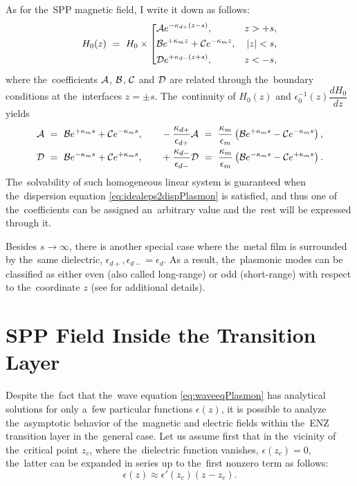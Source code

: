 As for the~SPP magnetic field, I write it down as follows:
\begin{equation}
\label{eq:idealeps2HfieldPlasmon}
H_0(z)~=~H_0 \times \left[
\begin{aligned}
&{\mathcal A} e^{-\kappa_{d+} (z-s)}, &z>+s,\\
&{\mathcal B} e^{+\kappa_m z} + {\mathcal C} e^{-\kappa_m z}, &|z|<s,\\
&{\mathcal D} e^{+\kappa_{d-} (z+s)}, &z<-s,\\
\end{aligned}
\right.
\end{equation}
where the~coefficients ${\mathcal A}$, ${\mathcal B}$, ${\mathcal C}$ and ${\mathcal D}$ are related through the~boundary conditions at the~interfaces $z=\pm s$.
The~continuity of $H_0(z)$ and $\epsilon_0^{-1}(z)\dfrac{dH_0}{dz}$ yields
\begin{align}
{\mathcal A}~=~{\mathcal B} e^{+\kappa_m s} + {\mathcal C} e^{-\kappa_m s},& \qquad
-\frac{\kappa_{d+}}{\epsilon_{d+}}{\mathcal A}~=~\frac{\kappa_m}{\epsilon_m}\left({\mathcal B} e^{+\kappa_m s} - {\mathcal C} e^{-\kappa_m s}\right), \\
{\mathcal D}~=~{\mathcal B} e^{-\kappa_m s} + {\mathcal C} e^{+\kappa_m s},& \qquad
+\frac{\kappa_{d-}}{\epsilon_{d-}}{\mathcal D}~=~\frac{\kappa_m}{\epsilon_m}\left({\mathcal B} e^{-\kappa_m s} - {\mathcal C} e^{+\kappa_m s}\right).
\end{align}
The~solvability of such homogeneous linear system is guaranteed when the~dispersion equation \cref{eq:idealeps2dispPlasmon} is satisfied, and thus one of the~coefficients can be assigned an~arbitrary value and the~rest will be expressed through it.

Besides $s \rightarrow \infty$, there is another special case where the~metal film is surrounded by the~same dielectric, $\epsilon_{d+},\epsilon_{d-}=\epsilon_{d}$.
As a result, the~plasmonic modes can be classified as either even (also called long-range) or odd (short-range) with respect to the~coordinate $z$ (see \cite{zayats} for additional details).



\section{SPP Field Inside the Transition Layer}

Despite the~fact that the~wave equation \cref{eq:waveeqPlasmon} has analytical solutions for only a~few particular functions $\epsilon(z)$, it is possible to analyze the~asymptotic behavior of the~magnetic and electric fields within the~ENZ transition layer in the~general case.
Let us assume first that in the~vicinity of the~critical point $z_c$, where the~dielectric function vanishes, $\epsilon(z_c)=0$, the~latter can be expanded in series up to the~first nonzero term as follows:
\begin{equation}
\epsilon(z) \approx \epsilon'(z_c)(z-z_c).
\end{equation}


